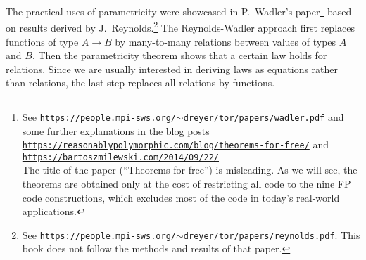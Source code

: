 The practical uses of parametricity were showcased in P.~Wadler\textsf{'}s
paper\footnote{See \texttt{\href{https://people.mpi-sws.org/~dreyer/tor/papers/wadler.pdf}{https://people.mpi-sws.org/$\sim$dreyer/tor/papers/wadler.pdf}}
and some further explanations in the blog posts \texttt{\href{https://reasonablypolymorphic.com/blog/theorems-for-free/}{https://reasonablypolymorphic.com/blog/theorems-for-free/}}
and \texttt{\href{https://bartoszmilewski.com/2014/09/22/}{https://bartoszmilewski.com/2014/09/22/}}\\
The title of the paper (\textsf{``}Theorems for free\textsf{''})
is misleading. As we will see, the theorems are obtained only at the
cost of restricting all code to the nine FP code constructions, which
excludes most of the code in today\textsf{'}s real-world applications.} based on results derived by J.~Reynolds.\footnote{See \texttt{\href{https://people.mpi-sws.org/~dreyer/tor/papers/reynolds.pdf}{https://people.mpi-sws.org/$\sim$dreyer/tor/papers/reynolds.pdf}}.
This book does not follow the methods and results of that paper.} The Reynolds-Wadler approach first replaces functions of type $A\rightarrow B$
by many-to-many relations between values of types $A$ and $B$. Then
the parametricity theorem shows that a certain law holds for relations.
Since we are usually interested in deriving laws as equations rather
than relations, the last step replaces all relations by functions.

